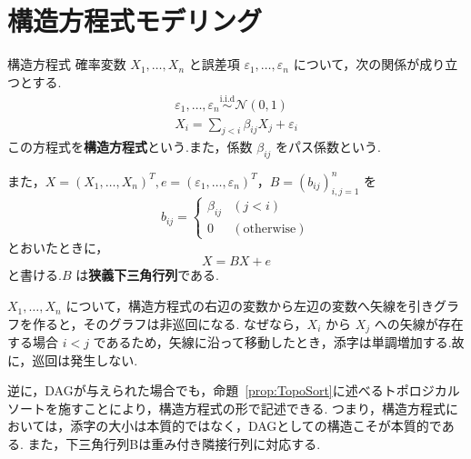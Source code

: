 \documentclass[uplatex, dvipdfmx]{jsarticle}
\begin{document}
\newpage

\section{構造方程式モデリング}

\begin{defn}{構造方程式}
  確率変数 $X_1, \dots, X_n$ と誤差項 $\varepsilon_1, \dots, \varepsilon_n$ について，次の関係が成り立つとする.
  \begin{align}
    \varepsilon_1, \dots, \varepsilon_n \overset{\text{i.i.d}}{\sim} \mathcal{N}(0, 1) \\
    X_i = \sum_{j < i} \beta_{ij} X_j + \varepsilon_i
  \end{align}
  この方程式を\textbf{構造方程式}という.また，係数 $\beta_{ij}$ をパス係数という.

また，$X = (X_1, \dots, X_n)^T, e = (\varepsilon_1, \dots, \varepsilon_n)^T$，$B = (b_{ij})_{i,j=1}^n$ を
\[
  b_{ij} = 
  \begin{cases} 
  \beta_{ij} & (j < i) \\
  0 & (\text{otherwise}) 
  \end{cases}
\]
とおいたときに，
\[
  X = BX + e
\]
と書ける.$B$ は\textbf{狭義下三角行列}である.
\end{defn}

$X_1, \dots, X_n$ について，構造方程式の右辺の変数から左辺の変数へ矢線を引きグラフを作ると，そのグラフは非巡回になる.
なぜなら，$X_i$ から $X_j$ への矢線が存在する場合 $i < j$ であるため，矢線に沿って移動したとき，添字は単調増加する.故に，巡回は発生しない.

逆に，DAGが与えられた場合でも，命題~\ref{prop:TopoSort}に述べるトポロジカルソートを施すことにより，構造方程式の形で記述できる.
つまり，構造方程式においては，添字の大小は本質的ではなく，DAGとしての構造こそが本質的である.
また，下三角行列Bは重み付き隣接行列に対応する.
\end{document}
